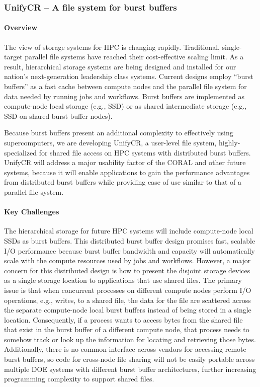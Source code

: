 \subsubsection{ UnifyCR -- A file system for burst buffers} 

\paragraph{Overview} 

The view of storage systems for HPC is changing rapidly. Traditional, 
single-target parallel file systems have reached their cost-effective 
scaling limit. As a result, hierarchical storage systems are being designed 
and installed for our nation's next-generation leadership class systems. 
Current designs employ “burst buffers” as a fast cache between compute 
nodes and the parallel file system for data needed by running jobs and 
workflows. Burst buffers are implemented as compute-node local storage 
(e.g., SSD) or as shared intermediate storage (e.g., SSD on shared burst 
buffer nodes).

Because burst buffers present an additional complexity to effectively
using supercomputers, we are developing UnifyCR, a user-level file system, 
highly-specialized for shared file access on HPC systems with distributed 
burst buffers.  UnifyCR will address a major usability 
factor of the CORAL and other future systems, because it will enable 
applications to gain the performance advantages from distributed burst buffers 
while providing ease of use similar to that of a parallel file system.


\paragraph{Key  Challenges}

The hierarchical storage for future HPC systems will include compute-node
local SSDs as burst buffers. This distributed burst buffer design promises
fast, scalable I/O performance because burst buffer bandwidth and capacity
will automatically scale with the compute resources used by jobs and
workflows. However, a major concern for this distributed design is how to
present the disjoint storage devices as a single storage location to
applications that use shared files. The primary issue is that when concurrent
processes on different compute nodes perform I/O operations, e.g., writes,
to a shared file, the data for the file are scattered across the separate
compute-node local burst buffers instead of being stored in a single
location. Consequently, if a process wants to access bytes from the
shared file that exist in the burst buffer of a different compute node,
that process needs to somehow track or look up the information for locating
and retrieving those bytes. Additionally, there is no common interface across
vendors for accessing remote burst buffers, so code for cross-node file
sharing will not be easily portable across multiple DOE systems with
different burst buffer architectures, further increasing programming
complexity to support shared files.

